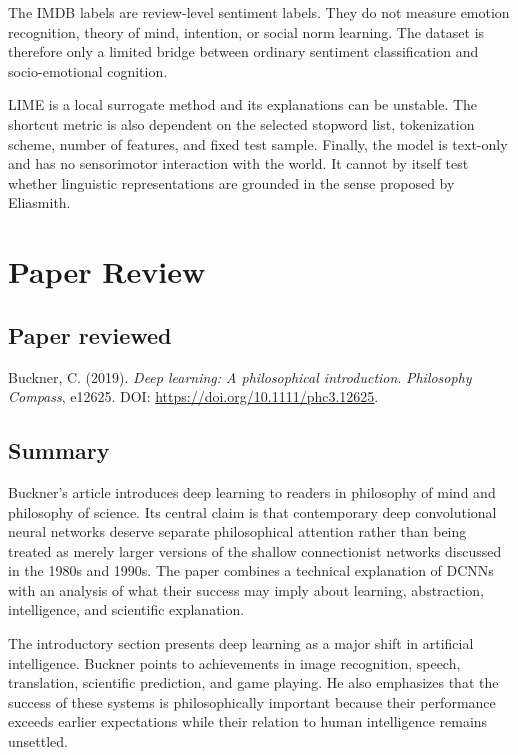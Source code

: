\documentclass[11pt]{article}
\begin{document}
The IMDB labels are review-level sentiment labels. They do not measure emotion recognition, theory of mind, intention, or social norm learning. The dataset is therefore only a limited bridge between ordinary sentiment classification and socio-emotional cognition.

LIME is a local surrogate method and its explanations can be unstable. The shortcut metric is also dependent on the selected stopword list, tokenization scheme, number of features, and fixed test sample. Finally, the model is text-only and has no sensorimotor interaction with the world. It cannot by itself test whether linguistic representations are grounded in the sense proposed by Eliasmith.

\newpage

\section{Paper Review}
\label{sec:paper-review}

\subsection*{Paper reviewed}

Buckner, C. (2019). \textit{Deep learning: A philosophical introduction}. \textit{Philosophy Compass}, e12625. DOI: \url{https://doi.org/10.1111/phc3.12625}.

\subsection{Summary}

Buckner's article introduces deep learning to readers in philosophy of mind and philosophy of science. Its central claim is that contemporary deep convolutional neural networks deserve separate philosophical attention rather than being treated as merely larger versions of the shallow connectionist networks discussed in the 1980s and 1990s. The paper combines a technical explanation of DCNNs with an analysis of what their success may imply about learning, abstraction, intelligence, and scientific explanation.

The introductory section presents deep learning as a major shift in artificial intelligence. Buckner points to achievements in image recognition, speech, translation, scientific prediction, and game playing. He also emphasizes that the success of these systems is philosophically important because their performance exceeds earlier expectations while their relation to human intelligence remains unsettled.
\end{document}
